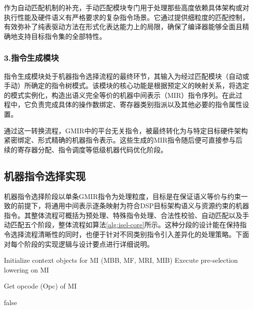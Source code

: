 作为自动匹配机制的补充，手动匹配模块专门用于处理那些高度依赖具体架构或对执行性能及硬件语义有严格要求的复杂指令场景。它通过提供细粒度的匹配控制，有效弥补了纯表驱动方法在形式化表达能力上的局限，确保了编译器能够全面且精确地支持目标指令集的全部特性。


\subsubsection{3.指令生成模块}
指令生成模块处于机器指令选择流程的最终环节，其输入为经过匹配模块（自动或手动）所确定的指令树模式。该模块的核心功能是根据预定义的映射关系，将选定的模式实例化，构造出语义完全等价的机器中间表示（MIR）指令序列。在此过程中，它负责完成具体的操作数绑定、寄存器类别指派以及其他必要的指令属性设置。

\par

通过这一转换流程，GMIR中的平台无关指令，被最终转化为与特定目标硬件架构紧密绑定、形式精确的机器指令表示。这些生成的MIR指令随后便可直接参与后续的寄存器分配、指令调度等低级机器代码优化阶段。


\subsection{机器指令选择实现}
机器指令选择阶段以单条GMIR指令为处理粒度，目标是在保证语义等价与约束一致的前提下，将通用中间表示逐条映射为符合DSP目标架构语义与资源约束的机器指令。其整体流程可概括为预处理、特殊指令处理、合法性校验、自动匹配以及手动匹配五个阶段，整体流程如算法\ref{alg:isel-core}所示。这种分段的设计能在保持指令选择流程清晰性的同时，也便于针对不同类别指令引入差异化的处理策略。下面对每个阶段的实现逻辑与设计要点进行详细说明。

\begin{algorithm}[htbp]
	\SetAlgoLined
	\linespread{1}\selectfont
	
	\caption{Core Logic of Instruction Selector}
	\label{alg:isel-core}
	Initialize context objects for MI (MBB, MF, MRI, MIB)\;
	Execute pre-selection lowering on MI\;
	
	Get opcode (Opc) of MI\;
	
	
	
	
	\Return false\;
\end{algorithm}


